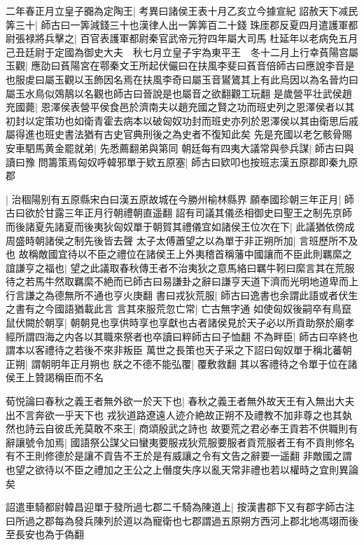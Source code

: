 二年春正月立皇子嚻為定陶王|{
	考異曰諸侯王表十月乙亥立今據宣紀}
詔赦天下减民筭三十|{
	師古曰一筭減錢三十也漢律人出一筭筭百二十錢}
珠厓郡反夏四月遣護軍都尉張禄將兵擊之|{
	百官表護軍都尉秦官武帝元狩四年屬大司馬}
杜延年以老病免五月己丑廷尉于定國為御史大夫　秋七月立皇子宇為東平王　冬十二月上行幸萯陽宫屬玉觀|{
	應劭曰萯陽宮在鄠秦文王所起伏儼曰在扶風李斐曰萯音倍師古曰應說李音是也服䖍曰屬玉觀以玉飾因名焉在扶風李奇曰屬玉音鸑鷟其上有此烏因以為名晉灼曰屬玉水鳥似鵁鶄以名觀也師古曰晉說是也屬音之欲翻觀工玩翻}
是歲營平壮武侯趙充國薨|{
	恩澤侯表營平侯食邑於濟南夫以趙充國之賢之功而班史列之恩澤侯者以其初封以定策功也如衛青霍去病本以破匈奴功封而班史亦列於恩澤侯以其由衛思后戚屬得進也班史書法猶有古史官典刑後之為史者不復知此矣}
先是充國以老乞骸骨賜安車駟馬黄金罷就弟|{
	先悉薦翻弟與第同}
朝廷每有四夷大議常與參兵謀|{
	師古曰與讀曰豫}
問籌策焉匈奴呼韓邪單于欵五原塞|{
	師古曰欵叩也按班志漢五原郡即秦九原郡}


|{
	治稒陽别有五原縣宋白曰漢五原故城在今勝州榆林縣界}
願奉國珍朝三年正月|{
	師古曰欲於甘露三年正月行朝禮朝直遥翻}
詔有司議其儀丞相御史曰聖王之制先京師而後諸夏先諸夏而後夷狄匈奴單于朝賀其禮儀宜如諸侯王位次在下|{
	此議猶依傍成周盛時朝諸侯之制先後皆去聲}
太子太傅蕭望之以為單于非正朔所加|{
	言班歷所不及也}
故稱敵國宜待以不臣之禮位在諸侯王上外夷稽首稱藩中國讓而不臣此則羈縻之誼謙亨之福也|{
	望之此議取春秋傳王者不治夷狄之意馬絡曰羈牛靷曰縻言其在荒服待之若馬牛然取羈縻不絶而已師古曰易謙卦之辭曰謙亨天道下濟而光明地道卑而上行言謙之為德無所不通也亨火庚翻}
書曰戎狄荒服|{
	師古曰逸書也余謂此語或者伏生之書有之今國語猶載此言}
言其來服荒忽亡常|{
	亡古無字通}
如使匈奴後嗣卒有鳥竄鼠伏闕於朝享|{
	朝朝見也享供時享也享獻也古者諸侯見於天子必以所貢助祭於廟孝經所謂四海之内各以其職來祭者也卒讀曰粹師古曰子恤翻}
不為畔臣|{
	師古曰卒終也謂本以客禮待之若後不來非叛臣}
萬世之長策也天子采之下詔曰匈奴單于稱北蕃朝正朔|{
	謂朝明年正月朔也}
朕之不德不能弘覆|{
	覆敷救翻}
其以客禮待之令單于位在諸侯王上贊謁稱臣而不名

荀悦論曰春秋之義王者無外欲一於天下也|{
	春秋之義王者無外故天王有入無出大夫出不言奔欲一乎天下也}
戎狄道路遼遠人迹介絶故正朔不及禮教不加非尊之也其埶然也詩云自彼氐羌莫敢不來王|{
	商頌殷武之詩也}
故要荒之君必奉王貢若不供職則有辭讓號令加焉|{
	國語祭公謀父曰蠻夷要服戎狄荒服要服者貢荒服者王有不貢則修名有不王則修德於是讓不貢告不王於是有威讓之令有文告之辭要一遥翻}
非敵國之謂也望之欲待以不臣之禮加之王公之上僭度失序以亂天常非禮也若以權時之宜則異論矣

詔遣車騎都尉韓昌迎單于發所過七郡二千騎為陳道上|{
	按漢書郡下又有郡字師古注曰所過之郡每為發兵陳列於道以為寵衛也七郡謂過五原朔方西河上郡北地馮翊而後至長安也為于偽翻}


